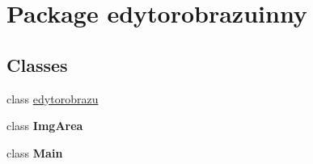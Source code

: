 \hypertarget{namespaceedytorobrazuinny}{}\section{Package edytorobrazuinny}
\label{namespaceedytorobrazuinny}
\subsection*{Classes}
\begin{DoxyCompactItemize}
\item 
class \hyperlink{classedytorobrazuinny_1_1edytorobrazu}{edytorobrazu}
\item 
class {\bfseries Img\+Area}
\item 
class {\bfseries Main}
\end{DoxyCompactItemize}
